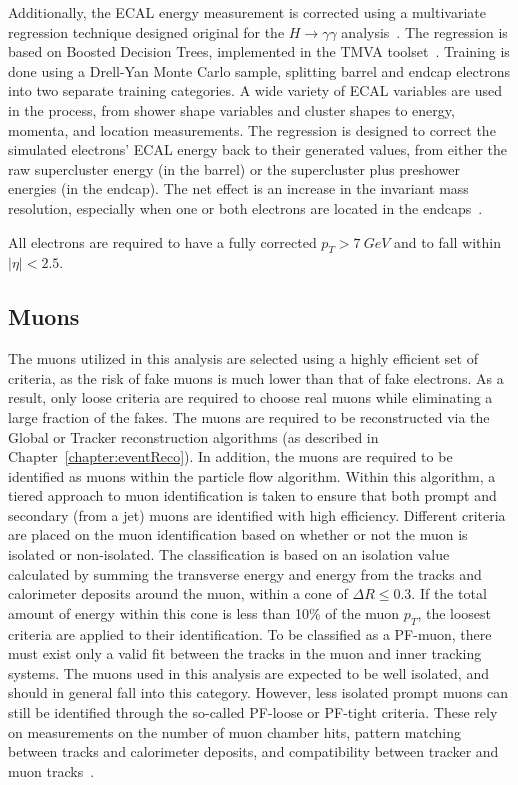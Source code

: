 Additionally, the ECAL energy measurement is corrected using a multivariate
regression technique designed original for the $H\rightarrow \gamma \gamma$
analysis~\cite{HggRegression}. The regression is based on Boosted Decision
Trees, implemented in the TMVA toolset~\cite{BDTs, BDTs2, TMVA}. Training is done using a
Drell-Yan Monte Carlo sample, splitting barrel and endcap electrons into two
separate training categories.  A wide variety of ECAL variables are used in the
process, from shower shape variables and cluster shapes to energy, momenta, and
location measurements.  The regression is designed to correct the simulated
electrons' ECAL energy back to their generated values, from either the raw
supercluster energy (in the barrel) or the supercluster plus preshower energies
(in the endcap). The net effect is an increase in the invariant mass resolution,
especially when one or both electrons are located in the
endcaps~\cite{zzHiggsMoriond}.

All electrons are required to have a fully corrected $p_T >7~GeV$ and to fall
within $|\eta|<2.5$.

\subsection{Muons}
\label{sub:muDef}
The muons utilized in this analysis are selected using a highly efficient set of
criteria, as the risk of fake muons is much lower than that of fake electrons.
As a result, only loose criteria are required to choose real muons while
eliminating a large fraction of the fakes. The muons are required to be
reconstructed via the Global or Tracker reconstruction algorithms (as described
in Chapter~\ref{chapter:eventReco}). In addition, the muons are required to be
identified as muons within the particle flow algorithm\cite{pflow}. Within this algorithm,
a tiered approach to muon identification is taken to ensure that both prompt and
secondary (from a jet) muons are identified with high efficiency. Different
criteria are placed on the muon identification based on whether or not the muon
is isolated or non-isolated. The classification is based on an isolation value
calculated by summing the transverse energy and energy from the tracks and
calorimeter deposits around the muon, within a cone of $\Delta R \le 0.3$. If the
total amount of energy within this cone is less than 10\% of the muon $p_T$, the
loosest criteria are applied to their identification. To be classified as a
PF-muon, there must exist only a valid fit between the tracks in the muon and
inner tracking systems. The muons used in this analysis are expected to be well
isolated, and should in general fall into this category. However, less isolated
prompt muons can still be identified through the so-called PF-loose or PF-tight
criteria. These rely on measurements on the number of muon chamber hits, pattern
matching between tracks and calorimeter deposits, and compatibility between
tracker and muon tracks~\cite{pflowMuons}.

